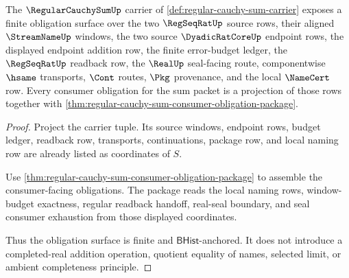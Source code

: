 \begin{theorem}
\label{thm:regular-cauchy-sum-obligation-surface}
The $\RegularCauchySumUp$ carrier of \autoref{def:regular-cauchy-sum-carrier} exposes a finite obligation surface over the two $\RegSeqRatUp$ source rows, their aligned $\StreamNameUp$ windows, the two source $\DyadicRatCoreUp$ endpoint rows, the displayed endpoint addition row, the finite error-budget ledger, the $\RegSeqRatUp$ readback row, the $\RealUp$ seal-facing route, componentwise $\hsame$ transports, $\Cont$ routes, $\Pkg$ provenance, and the local $\NameCert$ row. Every consumer obligation for the sum packet is a projection of those rows together with \autoref{thm:regular-cauchy-sum-consumer-obligation-package}.
\end{theorem}
\begin{proof}
Project the carrier tuple. Its source windows, endpoint rows, budget ledger, readback row, transports, continuations, package row, and local naming row are already listed as coordinates of $S$.

Use \autoref{thm:regular-cauchy-sum-consumer-obligation-package} to assemble the consumer-facing obligations. The package reads the local naming rows, window-budget exactness, regular readback handoff, real-seal boundary, and seal consumer exhaustion from those displayed coordinates.

Thus the obligation surface is finite and $\mathsf{BHist}$-anchored. It does not introduce a completed-real addition operation, quotient equality of names, selected limit, or ambient completeness principle.
\end{proof}

